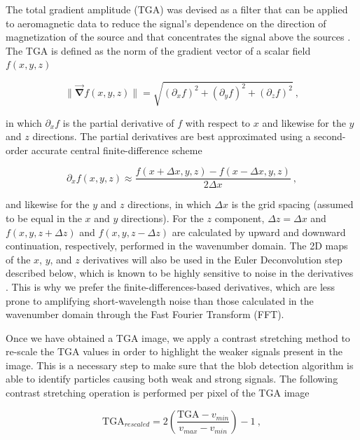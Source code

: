 The total gradient amplitude (TGA) was devised as a filter that can be applied
to aeromagnetic data to reduce the signal's dependence on the direction of
magnetization of the source and that concentrates the signal above the sources
\citep{Roest1992Magnetic, Nabighian2005}. The TGA is defined as the norm of the
gradient vector of a scalar field $f(x, y, z)$

\begin{equation}
\|\vec{\mathbf{\nabla}}f(x, y, z)\|  =
\sqrt{(\partial_x f)^2 + (\partial_y f)^2 + (\partial_z f)^2}
\ ,
\end{equation}

\noindent
in which $\partial_x f$ is the partial derivative of $f$ with respect to $x$
and likewise for the $y$ and $z$ directions. The partial derivatives are best
approximated using a second-order accurate central finite-difference scheme

\begin{equation}
\partial_x f(x, y, z) \approx
\dfrac{f(x + \Delta x, y, z) - f(x - \Delta x, y, z)}{2 \Delta x}
\ ,
\end{equation}

\noindent
and likewise for the $y$ and $z$ directions, in which $\Delta x$ is the grid
spacing (assumed to be equal in the $x$ and $y$ directions). For the $z$
component, $\Delta z = \Delta x$ and $f(x, y, z + \Delta z)$ and
$f(x, y, z - \Delta z)$ are calculated by upward and downward continuation,
respectively, performed in the wavenumber domain. The 2D maps of the $x$, $y$,
and $z$ derivatives will also be used in the Euler Deconvolution step described
below, which is known to be highly sensitive to noise in the derivatives
\citep{Saleh2012Applying}. This is why we prefer the finite-differences-based
derivatives, which are less prone to amplifying short-wavelength noise than
those calculated in the wavenumber domain through the Fast Fourier Transform
(FFT).

Once we have obtained a TGA image, we apply a contrast stretching method to
re-scale the TGA values in order to highlight the weaker signals present in the
image. This is a necessary step to make sure that the blob detection algorithm
is able to identify particles causing both weak and strong signals. The
following contrast stretching operation is performed per pixel of the TGA image

\begin{equation}
\text{TGA}_{rescaled} =
2\left(\dfrac{\text{TGA} - v_{min}}{v_{max} - v_{min}}\right) - 1
\ ,
\end{equation}

